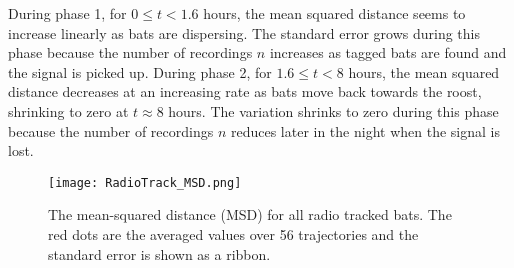 During phase 1, for $0 \leq t < 1.6$ hours, the mean squared distance seems to increase linearly as bats are dispersing. The standard error grows during this phase because the number of recordings $n$ increases as tagged bats are found and the signal is picked up. During phase 2, for $1.6 \leq t < 8$ hours, the mean squared distance decreases at an increasing rate as bats move back towards the roost, shrinking to zero at $t \approx 8$ hours. The variation shrinks to zero during this phase because the number of recordings $n$ reduces later
in the night when the signal is lost.
%
\begin{figure} [h]
    \centering
        \texttt{[image: RadioTrack\_MSD.png]}
        \caption{The mean-squared distance (MSD) for all radio tracked bats.
        The red dots are the averaged values over 56 trajectories and the standard error is shown as a ribbon.}
    \label{fig:MSD}
\end{figure}
